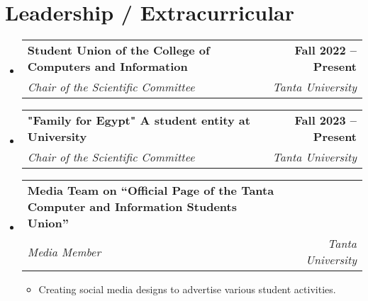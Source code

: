 \documentclass[letterpaper,11pt]{article}
\makeatletter
\newcommand{\resumeItem}[1]{
  \item\small{
    {#1 \vspace{-2pt}}
  }
}
\newcommand{\resumeSubheading}[4]{
  \vspace{-2pt}\item
    \begin{tabular*}{1.0\textwidth}[t]{l@{\extracolsep{\fill}}r}
      \textbf{#1} & \textbf{\small #2} \\
      \textit{\small#3} & \textit{\small #4} \\
    \end{tabular*}\vspace{-7pt}
}
\newcommand{\resumeSubHeadingListStart}{\begin{itemize}[leftmargin=0.0in, label={}]}
\newcommand{\resumeSubHeadingListEnd}{\end{itemize}}
\newcommand{\resumeItemListStart}{\begin{itemize}}
\newcommand{\resumeItemListEnd}{\end{itemize}\vspace{-5pt}}
\makeatother
\begin{document}
\section{Leadership / Extracurricular}
    \resumeSubHeadingListStart
        \resumeSubheading{Student Union of the College of Computers and Information}{Fall 2022 -- Present}{Chair of the Scientific Committee }{Tanta University}            
        \resumeSubheading{"Family for Egypt" A student entity at University}{Fall 2023 -- Present}{Chair of the Scientific Committee }{Tanta University}
        \resumeSubheading
{Media Team on “Official Page of the Tanta Computer and Information Students Union”}{}{Media Member   \href{https://www.facebook.com/FCITUStudentUnion/posts/pfbid0gVqNnqsg43vtcHXkuPAr9RSEgsVUAijRtCCnKQdpnhQZYvBExtHMEteyF1bm4yjVl}{ \faFacebookSquare}}{Tanta University}
            \resumeItemListStart
                \resumeItem{Creating social media designs to advertise various student activities.}
            \resumeItemListEnd


            
        
    \resumeSubHeadingListEnd
\end{document}
